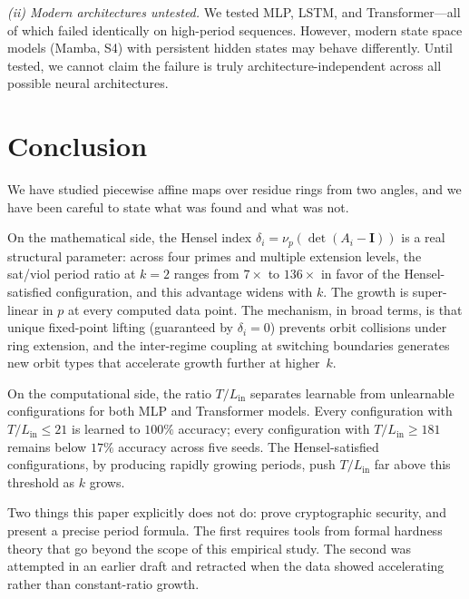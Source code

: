 \documentclass[11pt]{article}
\theoremstyle{plain}
\theoremstyle{definition}
\newcommand{\vp}{\nu_p}
\newcommand{\Id}{\mathbf{I}}
\begin{document}
\textit{(ii) Modern architectures untested.} We tested MLP, LSTM, and Transformer---all of which failed identically on high-period sequences. However, modern state space models (Mamba, S4) with persistent hidden states may behave differently. Until tested, we cannot claim the failure is truly architecture-independent across all possible neural architectures.

\section{Conclusion}
\label{sec:conclusion}

We have studied piecewise affine maps over residue rings from two angles, and we have been careful to state what was found and what was not.

On the mathematical side, the Hensel index $\delta_i = \vp(\det(A_i - \Id))$ is a real structural parameter: across four primes and multiple extension levels, the sat/viol period ratio at $k=2$ ranges from $7\times$ to $136\times$ in favor of the Hensel-satisfied configuration, and this advantage widens with $k$. The growth is super-linear in $p$ at every computed data point. The mechanism, in broad terms, is that unique fixed-point lifting (guaranteed by $\delta_i = 0$) prevents orbit collisions under ring extension, and the inter-regime coupling at switching boundaries generates new orbit types that accelerate growth further at higher~$k$.

On the computational side, the ratio $T/L_{\mathrm{in}}$ separates learnable from unlearnable configurations for both MLP and Transformer models. Every configuration with $T/L_{\mathrm{in}} \leq 21$ is learned to $100\%$ accuracy; every configuration with $T/L_{\mathrm{in}} \geq 181$ remains below $17\%$ accuracy across five seeds. The Hensel-satisfied configurations, by producing rapidly growing periods, push $T/L_{\mathrm{in}}$ far above this threshold as $k$ grows.

Two things this paper explicitly does not do: prove cryptographic security, and present a precise period formula. The first requires tools from formal hardness theory that go beyond the scope of this empirical study. The second was attempted in an earlier draft and retracted when the data showed accelerating rather than constant-ratio growth.
\end{document}
